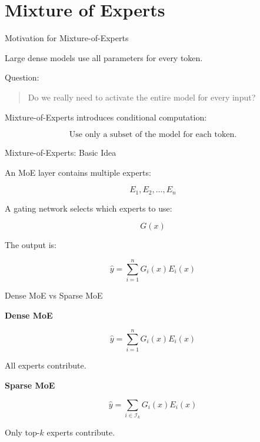 \documentclass[aspectratio=169]{beamer}
\begin{document}
\section{Mixture of Experts}

\begin{frame}{Motivation for Mixture-of-Experts}

Large dense models use all parameters for every token.

\vspace{0.4cm}

Question:

\begin{quote}
Do we really need to activate the entire model for every input?
\end{quote}

\vspace{0.4cm}

Mixture-of-Experts introduces conditional computation:

\[
\text{Use only a subset of the model for each token.}
\]

\end{frame}

\begin{frame}{Mixture-of-Experts: Basic Idea}

An MoE layer contains multiple experts:

\[
E_1, E_2, \ldots, E_n
\]

A gating network selects which experts to use:

\[
G(x)
\]

The output is:

\[
\hat{y}
=
\sum_{i=1}^{n}
G_i(x)E_i(x)
\]

\end{frame}

\begin{frame}{Dense MoE vs Sparse MoE}

\textbf{Dense MoE}

\[
\hat{y}
=
\sum_{i=1}^{n}
G_i(x)E_i(x)
\]

All experts contribute.

\vspace{0.5cm}

\textbf{Sparse MoE}

\[
\hat{y}
=
\sum_{i \in \mathcal{I}_k}
G_i(x)E_i(x)
\]

Only top-$k$ experts contribute.

\end{frame}
\end{document}

